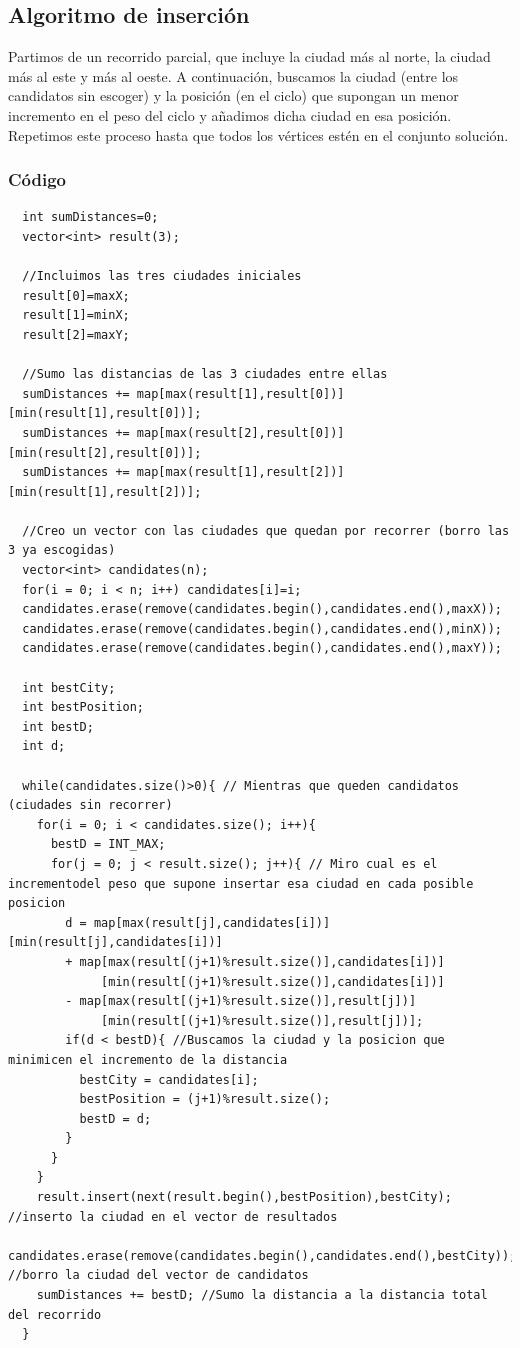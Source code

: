 \documentclass[a4]{article}
\begin{document}
\subsection{Algoritmo de inserción}

Partimos de un recorrido parcial, que incluye la ciudad más al norte,
la ciudad más al este y más al oeste. A continuación, buscamos la
ciudad (entre los candidatos sin escoger) y la posición (en el ciclo)
que supongan un menor incremento en el peso del ciclo y añadimos dicha
ciudad en esa posición. Repetimos este proceso hasta que todos los
vértices estén en el conjunto solución.

\subsubsection{Código}

\begin{lstlisting}
  int sumDistances=0;
  vector<int> result(3);

  //Incluimos las tres ciudades iniciales 
  result[0]=maxX;
  result[1]=minX;
  result[2]=maxY;

  //Sumo las distancias de las 3 ciudades entre ellas
  sumDistances += map[max(result[1],result[0])][min(result[1],result[0])];
  sumDistances += map[max(result[2],result[0])][min(result[2],result[0])];
  sumDistances += map[max(result[1],result[2])][min(result[1],result[2])];

  //Creo un vector con las ciudades que quedan por recorrer (borro las 3 ya escogidas)
  vector<int> candidates(n);
  for(i = 0; i < n; i++) candidates[i]=i;
  candidates.erase(remove(candidates.begin(),candidates.end(),maxX));
  candidates.erase(remove(candidates.begin(),candidates.end(),minX));
  candidates.erase(remove(candidates.begin(),candidates.end(),maxY));
  
  int bestCity;
  int bestPosition;
  int bestD;
  int d;

  while(candidates.size()>0){ // Mientras que queden candidatos (ciudades sin recorrer)
    for(i = 0; i < candidates.size(); i++){
      bestD = INT_MAX;
      for(j = 0; j < result.size(); j++){ // Miro cual es el incrementodel peso que supone insertar esa ciudad en cada posible posicion
        d = map[max(result[j],candidates[i])][min(result[j],candidates[i])]
        + map[max(result[(j+1)%result.size()],candidates[i])]
             [min(result[(j+1)%result.size()],candidates[i])]
        - map[max(result[(j+1)%result.size()],result[j])]
             [min(result[(j+1)%result.size()],result[j])];
        if(d < bestD){ //Buscamos la ciudad y la posicion que minimicen el incremento de la distancia
          bestCity = candidates[i];
          bestPosition = (j+1)%result.size();
          bestD = d;
        }
      }
    }
    result.insert(next(result.begin(),bestPosition),bestCity); //inserto la ciudad en el vector de resultados
    candidates.erase(remove(candidates.begin(),candidates.end(),bestCity)); //borro la ciudad del vector de candidatos
    sumDistances += bestD; //Sumo la distancia a la distancia total del recorrido
  }
\end{lstlisting}
\end{document}
